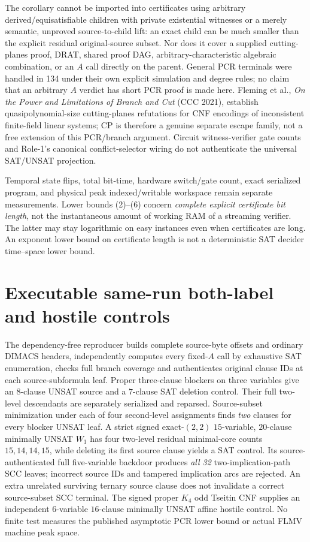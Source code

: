 \documentclass[11pt]{article}
\begin{document}
The corollary cannot be imported into certificates using arbitrary derived/equisatisfiable children with private existential witnesses or a merely semantic, unproved source-to-child lift: an exact child can be much smaller than the explicit residual original-source subset. Nor does it cover a supplied cutting-planes proof, DRAT, shared proof DAG, arbitrary-characteristic algebraic combination, or an $A$ call directly on the parent. General PCR terminals were handled in 134 under their own explicit simulation and degree rules; no claim that an arbitrary $A$ verdict has short PCR proof is made here. Fleming et al., \emph{On the Power and Limitations of Branch and Cut} (CCC 2021), establish quasipolynomial-size cutting-planes refutations for CNF encodings of inconsistent finite-field linear systems; CP is therefore a genuine separate escape family, not a free extension of this PCR/branch argument. Circuit witness-verifier gate counts and Role-1's canonical conflict-selector wiring do not authenticate the universal SAT/UNSAT projection.

Temporal state flips, total bit-time, hardware switch/gate count, exact serialized program, and physical peak indexed/writable workspace remain separate measurements. Lower bounds (2)--(6) concern \emph{complete explicit certificate bit length}, not the instantaneous amount of working RAM of a streaming verifier. The latter may stay logarithmic on easy instances even when certificates are long. An exponent lower bound on certificate length is not a deterministic SAT decider time--space lower bound.

\section{Executable same-run both-label and hostile controls}
The dependency-free reproducer builds complete source-byte offsets and ordinary DIMACS headers, independently computes every fixed-$A$ call by exhaustive SAT enumeration, checks full branch coverage and authenticates original clause IDs at each source-subformula leaf. Proper three-clause blockers on three variables give an $8$-clause UNSAT source and a $7$-clause SAT deletion control. Their full two-level descendants are separately serialized and reparsed. Source-subset minimization under each of four second-level assignments finds \emph{two} clauses for every blocker UNSAT leaf. A strict signed exact-$(2,2)$ $15$-variable, $20$-clause minimally UNSAT $W_1$ has four two-level residual minimal-core counts $15,14,14,15$, while deleting its first source clause yields a SAT control. Its source-authenticated full five-variable backdoor produces \emph{all 32} two-implication-path SCC leaves; incorrect source IDs and tampered implication arcs are rejected. An extra unrelated surviving ternary source clause does not invalidate a correct source-subset SCC terminal. The signed proper $K_4$ odd Tseitin CNF supplies an independent $6$-variable $16$-clause minimally UNSAT affine hostile control. No finite test measures the published asymptotic PCR lower bound or actual FLMV machine peak space.
\end{document}
